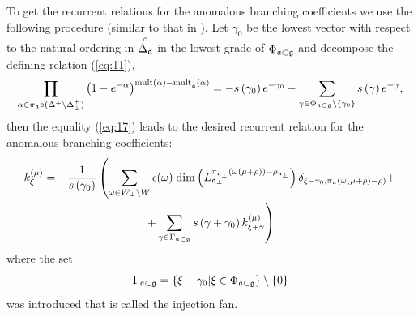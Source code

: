 \documentclass[a4paper,12pt]{article}
\theoremstyle{definition} \newtheorem{Def}{Definition}
\newcommand{\co}[1]{\overset{\circ }{#1}}
\begin{document}
To get the recurrent relations for the anomalous branching coefficients we use the following procedure  (similar to that in \cite{ilyin812pbc}).
Let $\gamma_{0} $ be the lowest vector with respect to the natural ordering in $%
\co{\Delta _{\frak{a}}}$ in the lowest grade of $\Phi _{\frak{a}\subset \frak{g}}$ and decompose the defining relation (\ref{eq:11}),
\begin{equation}
  \label{eq:18}
  \prod_{\alpha\in \pi_{\mathfrak{a}}\circ (\Delta^{+}\setminus \Delta^{+}_{\bot})}\left(
    1-e^{-\alpha }\right) ^{\mathrm{{mult}\left( \alpha \right) -{mult}}_{\frak{a%
      }}\mathrm{\left( \alpha \right) }}=-s\left( \gamma _{0}\right) e^{-\gamma
    _{0}}-\sum_{\gamma \in \Phi _{\frak{a}\subset \frak{g}}\setminus \left\{\gamma_{0}\right\}}s\left( \gamma \right) e^{-\gamma },
\end{equation}
then the equality (\ref{eq:17}) leads to the desired recurrent  relation for the anomalous branching coefficients:
\begin{multline}
  k_{\xi }^{\left( \mu \right) }=
  -\frac{1}{s\left( \gamma _{0}\right) }
  \left(
    \sum_{\omega\in W_{\bot}\backslash W} \epsilon(\omega)\; \mathrm{dim}
    \left(L^{\pi_{\mathfrak{a}_{\bot}}(\omega(\mu+\rho))-\rho_{\mathfrak{a}_{\bot}}}_{\mathfrak{a}_{\bot}}\right)
    \delta_{\xi-\gamma_0,\pi_{\mathfrak{a}}(\omega(\mu+\rho)-\rho)}+
    \right.\\
    \left. +
    \sum_{\gamma \in \Gamma _{\frak{a}\subset \frak{g}}} s\left( \gamma +\gamma _{0}\right) k_{\xi+\gamma }^{\left( \mu \right) }
  \right)
\label{recurrent-relation}
\end{multline}
where the set
\begin{equation}
\Gamma _{\frak{a}\subset \frak{g}}=\left\{ \xi -\gamma _{0}|\xi \in \Phi _{%
\frak{a}\subset \frak{g}}\right\} \setminus \left\{ 0\right\} 
\label{fan-defined}
\end{equation}
 was introduced that is called the injection fan.
\end{document}
